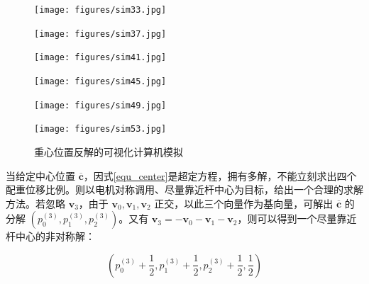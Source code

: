 \documentclass[a4paper]{ctexart}
\numberwithin{equation}{section}
\numberwithin{table}{section}
\numberwithin{figure}{section}
\begin{document}
\begin{figure}[H]
  \begin{minipage}{0.32\linewidth}
    \begin{center}
      \texttt{[image: figures/sim33.jpg]}
    \end{center}
  \end{minipage}
  \hfill
  \begin{minipage}{0.32\linewidth}
    \begin{center}
      \texttt{[image: figures/sim37.jpg]}
    \end{center}
  \end{minipage}
  \hfill
  \begin{minipage}{0.32\linewidth}
    \begin{center}
      \texttt{[image: figures/sim41.jpg]}
    \end{center}
  \end{minipage}
  \vfill
  \begin{minipage}{0.32\linewidth}
    \begin{center}
      \texttt{[image: figures/sim45.jpg]}
    \end{center}
  \end{minipage}
  \hfill
  \begin{minipage}{0.32\linewidth}
    \begin{center}
      \texttt{[image: figures/sim49.jpg]}
    \end{center}
  \end{minipage}
  \hfill
  \begin{minipage}{0.32\linewidth}
    \begin{center}
      \texttt{[image: figures/sim53.jpg]}
    \end{center}
  \end{minipage}
  \caption{重心位置反解的可视化计算机模拟}
\end{figure}

当给定中心位置 $\overline{\boldsymbol c}$，因式\ref{equ_center}是超定方程，拥有多解，不能立刻求出四个配重位移比例。则以电机对称调用、尽量靠近杆中心为目标，给出一个合理的求解方法。若忽略 $\boldsymbol v_3$，由于 $\boldsymbol v_0,\boldsymbol v_1,\boldsymbol v_2$ 正交，以此三个向量作为基向量，可解出 $\overline{\boldsymbol c}$ 的分解 $\left(p_0^{(3)},p_1^{(3)},p_2^{(3)}\right)$。又有 $\boldsymbol v_3 = - \boldsymbol v_0 -\boldsymbol v_1-\boldsymbol v_2$，则可以得到一个尽量靠近杆中心的非对称解：

\begin{equation}
  \left(p_0^{(3)} +\frac{1}{2}, p_1^{(3)} +\frac{1}{2}, p_2^{(3)} + \frac{1}{2}, \frac{1}{2}\right)
\end{equation}
\end{document}

